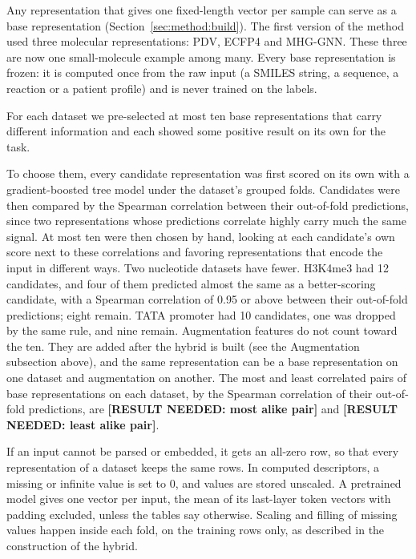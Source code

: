 Any representation that gives one fixed-length vector per sample can serve as a base representation (Section~\ref{sec:method:build}). The first version of the method used three molecular representations: PDV, ECFP4 and MHG-GNN. These three are now one small-molecule example among many. Every base representation is frozen: it is computed once from the raw input (a SMILES string, a sequence, a reaction or a patient profile) and is never trained on the labels.

For each dataset we pre-selected at most ten base representations that carry different information and each showed some positive result on its own for the task.

To choose them, every candidate representation was first scored on its own with a gradient-boosted tree model \citep{ke2017lightgbm} under the dataset's grouped folds. Candidates were then compared by the Spearman correlation between their out-of-fold predictions, since two representations whose predictions correlate highly carry much the same signal. At most ten were then chosen by hand, looking at each candidate's own score next to these correlations and favoring representations that encode the input in different ways. Two nucleotide datasets have fewer. H3K4me3 had 12 candidates, and four of them predicted almost the same as a better-scoring candidate, with a Spearman correlation of 0.95 or above between their out-of-fold predictions; eight remain. TATA promoter had 10 candidates, one was dropped by the same rule, and nine remain. Augmentation features do not count toward the ten. They are added after the hybrid is built (see the Augmentation subsection above), and the same representation can be a base representation on one dataset and augmentation on another.
The most and least correlated pairs of base representations on each dataset, by the Spearman correlation of their out-of-fold predictions, are \textbf{[RESULT NEEDED: most alike pair]} and \textbf{[RESULT NEEDED: least alike pair]}.

If an input cannot be parsed or embedded, it gets an all-zero row, so that every representation of a dataset keeps the same rows. In computed descriptors, a missing or infinite value is set to 0, and values are stored unscaled. A pretrained model gives one vector per input, the mean of its last-layer token vectors with padding excluded, unless the tables say otherwise. Scaling and filling of missing values happen inside each fold, on the training rows only, as described in the construction of the hybrid.

